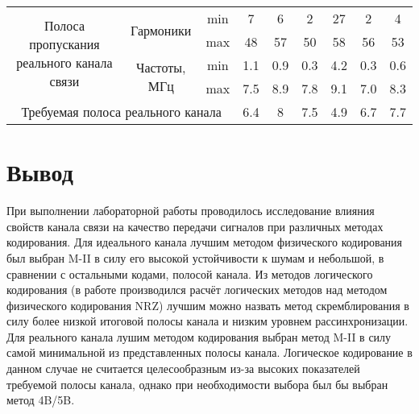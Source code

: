 \documentclass[12pt, a4paper] {ncc}
\begin{document}
\begin{tabular}{|c|c|c|c|c|c|c|c|c|}
        \multirow{4}{80pt}{Полоса пропускания реального канала связи} & \multirow{2}{*}{Гармоники} & min &
          7  &  6 &  2  & 27 & 2 & 4 \\
        \cline{3-9} & & max &
          48 & 57 & 50  & 58 & 56 & 53 \\
          \cline{2-9}
         & \multirow{2}{*}{Частоты, МГц} & min &
          1.1 & 0.9 & 0.3 & 4.2 & 0.3 & 0.6\\
        \cline{3-9} & & max &
          7.5 & 8.9 & 7.8 & 9.1 & 7.0 & 8.3 \\
        \cline{2-9}
        \hline
        \multicolumn{3}{|c|}{Требуемая полоса реального канала} &
          6.4 & 8 & 7.5 & 4.9 & 6.7 & 7.7 \\
        \hline
\end{tabular}

\section*{Вывод}

При выполнении лабораторной работы проводилось исследование влияния
свойств канала связи на качество передачи сигналов при различных методах
кодирования.
Для идеального канала лучшим методом физического кодирования был выбран M-II в силу
его высокой устойчивости к шумам  и небольшой, в сравнении с остальными
кодами, полосой канала. Из методов логического кодирования (в работе производился расчёт
логических методов над методом физического кодирования NRZ) лучшим можно назвать
метод скремблирования в силу более низкой итоговой полосы канала и низким
уровнем рассинхронизации.
Для реального канала лушим методом кодирования выбран метод M-II в силу самой
минимальной из представленных полосы канала. Логическое кодирование в данном
случае не считается целесообразным из-за высоких показателей требуемой
полосы канала, однако при необходимости выбора был бы выбран метод 4B/5B.
\end{document}
